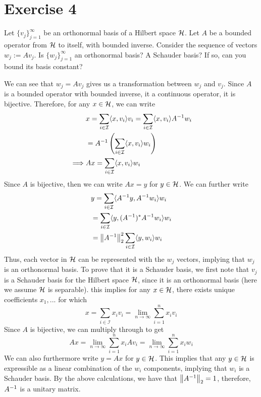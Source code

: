 \newcommand{\scI}{\mathcal{I}}

\clearpage
\newpage
\section{Exercise 4}
Let $\{v_j\}_{j = 1}^\infty$ be an orthonormal basis of a Hilbert space $\mathcal{H}$. Let $A$ be a bounded operator from $\mathcal{H}$ to itself, with bounded inverse. Consider the sequence of vectors $w_j := Av_j$. Is $\{w_j\}_{j = 1}^\infty$ an orthonormal basis? A Schauder basis? If so, can you bound its basis constant?
\partbreak
\begin{solution}

    We can see that $w_j = Av_j$ gives us a transformation between $w_j$ and $v_j$. Since $A$ is a bounded operator with bounded inverse, it a continuous operator, it is bijective. Therefore, for any $x \in \mathcal{H}$, we can write 
    \begin{align*}    
        &x = \sum_{i \in \scI} \braket{x}{v_i}v_i = \sum_{i \in \scI} \braket{x}{v_i}A\inv w_i\\
        &= A\inv\left(\sum_{i \in \scI} \braket{x}{v_i} w_i\right)\\
        \implies & Ax = \sum_{i \in \scI} \braket{x}{v_i}w_i
    \end{align*}
    Since $A$ is bijective, then we can write $Ax = y$ for $y \in \mathcal{H}$. We can further write
    \begin{align*}
        &y = \sum_{i \in \scI} \braket{A\inv y}{A\inv w_i}w_i\\
        &= \sum_{i \in \scI} \braket{y}{(A\inv)\star A\inv w_i}w_i\\
        &= \norm{A\inv}_2^2 \sum_{i \in \scI} \braket{y}{w_i}w_i
    \end{align*}
    Thus, each vector in $\mathcal{H}$ can be represented with the $w_j$ vectors, implying that $w_j$ is an orthonormal basis. To prove that it is a Schauder basis, we first note that $v_j$ is a Schauder basis for the Hilbert space $\mathcal{H}$, since it is an orthonormal basis (here we assume $\mathcal{H}$ is separable). this implies for any $x \in \mathcal{H}$, there exists unique coefficients $x_1, ...$ for which 
    \[x = \sum_{i \in \scI} x_i v_i = \lim_{n \to \infty}\sum_{i = 1}^n x_iv_i\]
    Since $A$ is bijective, we can multiply through to get 
    \[Ax = \lim_{n \to \infty}\sum_{i = 1}^n x_iAv_i = \lim_{n \to \infty}\sum_{i = 1}^n x_iw_i\]
    We can also furthermore write $y = Ax$ for $y \in \mathcal{H}$. This implies that any $y \in \mathcal{H}$ is expressible as a linear combination of the $w_i$ components, implying that $w_i$ is a Schauder basis. By the above calculations, we have that $\norm{A^{-1}}_2 = 1$, therefore, $A^{-1}$ is a unitary matrix.  
\end{solution} 


